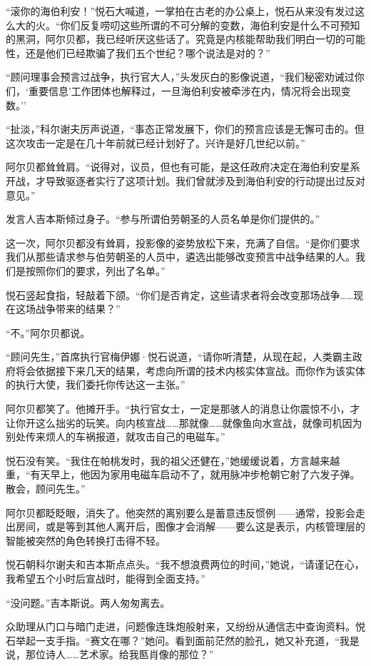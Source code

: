 \documentclass[AutoFakeBold=true]{book}
\begin{document}
``滚你的海伯利安！''悦石大喊道，一掌拍在古老的办公桌上，悦石从来没有发过这么大的火。``你们反复唠叨这些所谓的不可分解的变数，海伯利安是什么不可预知的黑洞，阿尔贝都，我已经听厌这些话了。究竟是内核能帮助我们明白一切的可能性，还是他们已经欺骗了我们五个世纪？哪个说法是对的？''

``顾问理事会预言过战争，执行官大人，''头发灰白的影像说道，``我们秘密劝诫过你们，`重要信息'工作团体也解释过，一旦海伯利安被牵涉在内，情况将会出现变数。''

``扯淡，''科尔谢夫厉声说道，``事态正常发展下，你们的预言应该是无懈可击的。但这次攻击一定是在几十年前就已经计划好了。兴许是好几世纪以前。''

阿尔贝都耸耸肩。``说得对，议员，但也有可能，是这任政府决定在海伯利安星系开战，才导致驱逐者实行了这项计划。我们曾就涉及到海伯利安的行动提出过反对意见。''

发言人吉本斯倾过身子。``参与所谓伯劳朝圣的人员名单是你们提供的。''

这一次，阿尔贝都没有耸肩，投影像的姿势放松下来，充满了自信。``是你们要求我们从那些请求参与伯劳朝圣的人员中，遴选出能够改变预言中战争结果的人。我们是按照你们的要求，列出了名单。''

悦石竖起食指，轻敲着下颌。``你们是否肯定，这些请求者将会改变那场战争……现在这场战争带来的结果？''

``不。''阿尔贝都说。

``顾问先生，''首席执行官梅伊娜·悦石说道，``请你听清楚，从现在起，人类霸主政府将会依据接下来几天的结果，考虑向所谓的技术内核实体宣战。而你作为该实体的执行大使，我们委托你传达这一主张。''

阿尔贝都笑了。他摊开手。``执行官女士，一定是那骇人的消息让你震惊不小，才让你开这么拙劣的玩笑。向内核宣战……那就像……就像鱼向水宣战，就像司机因为别处传来烦人的车祸报道，就攻击自己的电磁车。''

悦石没有笑。``我住在帕桃发时，我的祖父还健在，''她缓缓说着，方言越来越重，``有天早上，他因为家用电磁车启动不了，就用脉冲步枪朝它射了六发子弹。散会，顾问先生。''

阿尔贝都眨眨眼，消失了。他突然的离别要么是蓄意违反惯例——通常，投影会走出房间，或是等到其他人离开后，图像才会消解——要么这是表示，内核管理层的智能被突然的角色转换打击得不轻。

悦石朝科尔谢夫和吉本斯点点头。``我不想浪费两位的时间，''她说，``请谨记在心，我希望五个小时后宣战时，能得到全面支持。''

``没问题。''吉本斯说。两人匆匆离去。

众助理从门口与暗门走进，问题像连珠炮般射来，又纷纷从通信志中查询资料。悦石举起一支手指。``赛文在哪？''她问。看到面前茫然的脸孔，她又补充道，``我是说，那位诗人……艺术家。给我匦肖像的那位？''
\end{document}
